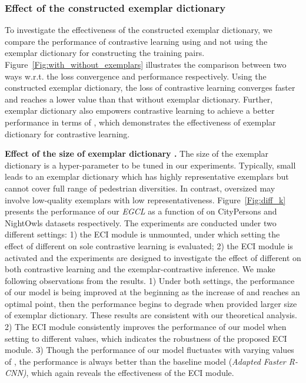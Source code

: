 \documentclass[journal]{IEEEtran}
\begin{document}
\subsubsection{Effect of the constructed exemplar dictionary}
To investigate the effectiveness of the constructed exemplar dictionary, we compare the performance of contrastive learning using and not using the exemplar dictionary for constructing the training pairs. Figure~\ref{Fig:with_without_exemplars} illustrates the comparison between two ways w.r.t. the loss convergence and performance respectively. Using the constructed exemplar dictionary, the loss of contrastive learning converges faster and reaches a lower value than that without exemplar dictionary. Further, exemplar dictionary also empowers contrastive learning to achieve a better performance in terms of , which demonstrates the effectiveness of exemplar dictionary for contrastive learning.

\noindent\textbf{Effect of the size of exemplar dictionary .} The size of the exemplar dictionary  is a hyper-parameter to be tuned in our experiments. Typically, small  leads to an exemplar dictionary which has highly representative exemplars but cannot cover full range of pedestrian diversities. In contrast, oversized  may involve low-quality exemplars with low representativeness. Figure~\ref{Fig:diff_k} presents the performance of our \emph{EGCL} as a function of  on CityPersons and NightOwls datasets respectively. The experiments are conducted under two different settings: 1) the ECI module is unmounted, under which setting the effect of different  on sole contrastive learning is evaluated; 2) the ECI module is activated and the experiments are designed to investigate the effect of different  on both contrastive learning and the exemplar-contrastive inference. We make following observations from the results. 1) Under both settings, the performance of our model is being improved at the beginning as the increase of  and reaches an optimal point, then the performance begins to degrade when provided larger size of exemplar dictionary. These results are consistent with our theoretical analysis. 2) The ECI module consistently improves the performance of our model when setting  to different values, which indicates the robustness of the proposed ECI module. 3) Though the performance of our model fluctuates with varying values of , the performance is always better than the baseline model (\emph{Adapted Faster R-CNN)}, which again reveals the effectiveness of the ECI module.
\end{document}
